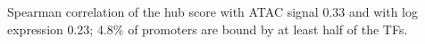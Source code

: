 Spearman correlation of the hub score with ATAC signal 0.33 and with log expression 0.23; 4.8\% of promoters are bound by at least half of the TFs.